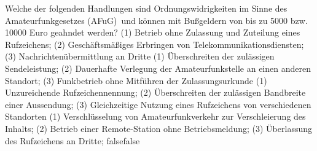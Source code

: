     {Welche der folgenden Handlungen sind Ordnungswidrigkeiten im Sinne des Amateurfunkgesetzes (AFuG) und können mit Bußgeldern von bis zu 5000 bzw. 10000 Euro geahndet werden?}
    {(1) Betrieb ohne Zulassung und Zuteilung eines Rufzeichens; (2) Geschäftsmäßiges Erbringen von Telekommunikationsdiensten; (3) Nachrichtenübermittlung an Dritte}
    {(1) Überschreiten der zulässigen Sendeleistung; (2) Dauerhafte Verlegung der Amateurfunkstelle an einen anderen Standort; (3) Funkbetrieb ohne Mitführen der Zulassungsurkunde}
    {(1) Unzureichende Rufzeichennennung; (2) Überschreiten der zulässigen Bandbreite einer Aussendung; (3) Gleichzeitige Nutzung eines Rufzeichens von verschiedenen Standorten}
    {(1) Verschlüsselung von Amateurfunkverkehr zur Verschleierung des Inhalts; (2) Betrieb einer Remote-Station ohne Betriebsmeldung; (3) Überlassung des Rufzeichens an Dritte;}
    {false}{false}